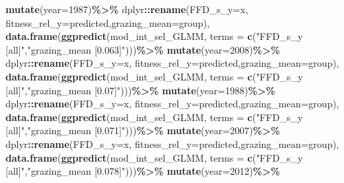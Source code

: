 \documentclass[
]{article}
\newenvironment{Shaded}{\begin{snugshade}}{\end{snugshade}}
\newcommand{\DataTypeTok}[1]{\textcolor[rgb]{0.13,0.29,0.53}{#1}}
\newcommand{\DecValTok}[1]{\textcolor[rgb]{0.00,0.00,0.81}{#1}}
\newcommand{\KeywordTok}[1]{\textcolor[rgb]{0.13,0.29,0.53}{\textbf{#1}}}
\newcommand{\NormalTok}[1]{#1}
\newcommand{\OperatorTok}[1]{\textcolor[rgb]{0.81,0.36,0.00}{\textbf{#1}}}
\newcommand{\StringTok}[1]{\textcolor[rgb]{0.31,0.60,0.02}{#1}}
\begin{document}
\begin{Shaded}
\begin{Highlighting}[]
\StringTok{      }\KeywordTok{mutate}\NormalTok{(}\DataTypeTok{year=}\DecValTok{1987}\NormalTok{)}\OperatorTok{\%\textgreater{}\%}
\StringTok{      }\NormalTok{dplyr}\OperatorTok{::}\KeywordTok{rename}\NormalTok{(}\DataTypeTok{FFD\_s\_y=}\NormalTok{x, }\DataTypeTok{fitness\_rel\_y=}\NormalTok{predicted,}\DataTypeTok{grazing\_mean=}\NormalTok{group),}
    \KeywordTok{data.frame}\NormalTok{(}\KeywordTok{ggpredict}\NormalTok{(mod\_int\_sel\_GLMM,}
                         \DataTypeTok{terms =} \KeywordTok{c}\NormalTok{(}\StringTok{"FFD\_s\_y [all]"}\NormalTok{,}\StringTok{"grazing\_mean [0.063]"}\NormalTok{)))}\OperatorTok{\%\textgreater{}\%}
\StringTok{      }\KeywordTok{mutate}\NormalTok{(}\DataTypeTok{year=}\DecValTok{2008}\NormalTok{)}\OperatorTok{\%\textgreater{}\%}
\StringTok{      }\NormalTok{dplyr}\OperatorTok{::}\KeywordTok{rename}\NormalTok{(}\DataTypeTok{FFD\_s\_y=}\NormalTok{x, }\DataTypeTok{fitness\_rel\_y=}\NormalTok{predicted,}\DataTypeTok{grazing\_mean=}\NormalTok{group),}
    \KeywordTok{data.frame}\NormalTok{(}\KeywordTok{ggpredict}\NormalTok{(mod\_int\_sel\_GLMM,}
                         \DataTypeTok{terms =} \KeywordTok{c}\NormalTok{(}\StringTok{"FFD\_s\_y [all]"}\NormalTok{,}\StringTok{"grazing\_mean [0.07]"}\NormalTok{)))}\OperatorTok{\%\textgreater{}\%}
\StringTok{      }\KeywordTok{mutate}\NormalTok{(}\DataTypeTok{year=}\DecValTok{1988}\NormalTok{)}\OperatorTok{\%\textgreater{}\%}
\StringTok{      }\NormalTok{dplyr}\OperatorTok{::}\KeywordTok{rename}\NormalTok{(}\DataTypeTok{FFD\_s\_y=}\NormalTok{x, }\DataTypeTok{fitness\_rel\_y=}\NormalTok{predicted,}\DataTypeTok{grazing\_mean=}\NormalTok{group),}
    \KeywordTok{data.frame}\NormalTok{(}\KeywordTok{ggpredict}\NormalTok{(mod\_int\_sel\_GLMM,}
                         \DataTypeTok{terms =} \KeywordTok{c}\NormalTok{(}\StringTok{"FFD\_s\_y [all]"}\NormalTok{,}\StringTok{"grazing\_mean [0.071]"}\NormalTok{)))}\OperatorTok{\%\textgreater{}\%}
\StringTok{      }\KeywordTok{mutate}\NormalTok{(}\DataTypeTok{year=}\DecValTok{2007}\NormalTok{)}\OperatorTok{\%\textgreater{}\%}
\StringTok{      }\NormalTok{dplyr}\OperatorTok{::}\KeywordTok{rename}\NormalTok{(}\DataTypeTok{FFD\_s\_y=}\NormalTok{x, }\DataTypeTok{fitness\_rel\_y=}\NormalTok{predicted,}\DataTypeTok{grazing\_mean=}\NormalTok{group),}
    \KeywordTok{data.frame}\NormalTok{(}\KeywordTok{ggpredict}\NormalTok{(mod\_int\_sel\_GLMM,}
                         \DataTypeTok{terms =} \KeywordTok{c}\NormalTok{(}\StringTok{"FFD\_s\_y [all]"}\NormalTok{,}\StringTok{"grazing\_mean [0.078]"}\NormalTok{)))}\OperatorTok{\%\textgreater{}\%}
\StringTok{      }\KeywordTok{mutate}\NormalTok{(}\DataTypeTok{year=}\DecValTok{2012}\NormalTok{)}\OperatorTok{\%\textgreater{}\%}

\end{Highlighting}
\end{Shaded}
\end{document}
